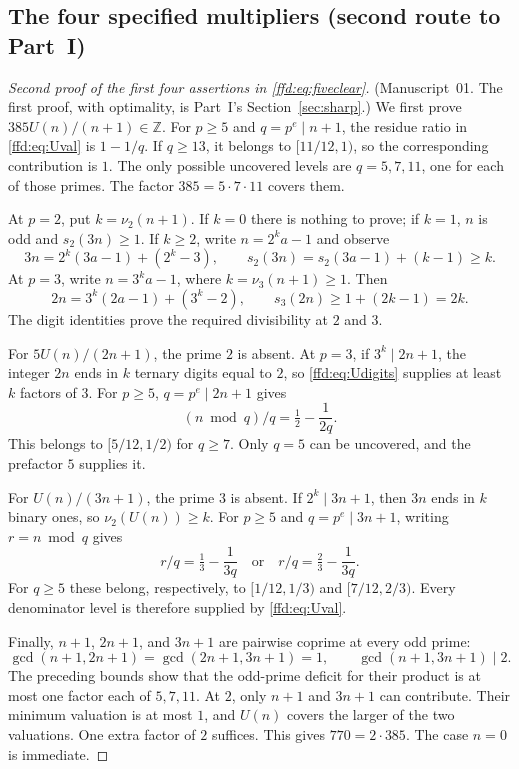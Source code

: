 \documentclass[11pt]{article}
\theoremstyle{definition}
\theoremstyle{remark}
\newcommand{\Z}{\mathbb Z}
\begin{document}
\subsection{The four specified multipliers (second route to Part~I)}\label{ffd:sec:specified}
\begin{proof}[Second proof of the first four assertions in \eqref{ffd:eq:fiveclear}]
(Manuscript~01. The first proof, with optimality, is Part~I's
Section~\ref{sec:sharp}.)
We first prove $385U(n)/(n+1)\in\Z$. For $p\ge5$ and $q=p^e\mid n+1$, the
residue ratio in \eqref{ffd:eq:Uval} is $1-1/q$. If $q\ge13$, it belongs to
$[11/12,1)$, so the corresponding contribution is $1$. The only possible
uncovered levels are $q=5,7,11$, one for each of those primes. The factor
$385=5\cdot7\cdot11$ covers them.

At $p=2$, put $k=\nu_2(n+1)$. If $k=0$ there is nothing to prove; if $k=1$,
$n$ is odd and $s_2(3n)\ge1$. If $k\ge2$, write $n=2^k a-1$ and observe
\[
 3n=2^k(3a-1)+(2^k-3),\qquad
 s_2(3n)=s_2(3a-1)+(k-1)\ge k.
\]
At $p=3$, write $n=3^k a-1$, where $k=\nu_3(n+1)\ge1$. Then
\[
 2n=3^k(2a-1)+(3^k-2),\qquad
 s_3(2n)\ge1+(2k-1)=2k.
\]
The digit identities prove the required divisibility at $2$ and $3$.

For $5U(n)/(2n+1)$, the prime $2$ is absent. At $p=3$, if
$3^k\mid2n+1$, the integer $2n$ ends in $k$ ternary digits equal to $2$,
so \eqref{ffd:eq:Udigits} supplies at least $k$ factors of $3$.
For $p\ge5$, $q=p^e\mid2n+1$ gives
\[
 (n\bmod q)/q=\tfrac12-\frac1{2q}.
\]
This belongs to $[5/12,1/2)$ for $q\ge7$. Only $q=5$ can be uncovered,
and the prefactor $5$ supplies it.

For $U(n)/(3n+1)$, the prime $3$ is absent. If $2^k\mid3n+1$, then
$3n$ ends in $k$ binary ones, so $\nu_2(U(n))\ge k$.
For $p\ge5$ and $q=p^e\mid3n+1$, writing $r=n\bmod q$ gives
\[
 r/q=\tfrac13-\frac1{3q}\quad\text{or}\quad
 r/q=\tfrac23-\frac1{3q}.
\]
For $q\ge5$ these belong, respectively, to $[1/12,1/3)$ and $[7/12,2/3)$.
Every denominator level is therefore supplied by \eqref{ffd:eq:Uval}.

Finally, $n+1$, $2n+1$, and $3n+1$ are pairwise coprime at every odd prime:
\[
 \gcd(n+1,2n+1)=\gcd(2n+1,3n+1)=1,\qquad
 \gcd(n+1,3n+1)\mid2.
\]
The preceding bounds show that the odd-prime deficit for their product is
at most one factor each of $5,7,11$. At $2$, only $n+1$ and $3n+1$ can
contribute. Their minimum valuation is at most $1$, and $U(n)$ covers the
larger of the two valuations. One extra factor of $2$ suffices. This gives
$770=2\cdot385$. The case $n=0$ is immediate.
\end{proof}
\end{document}
